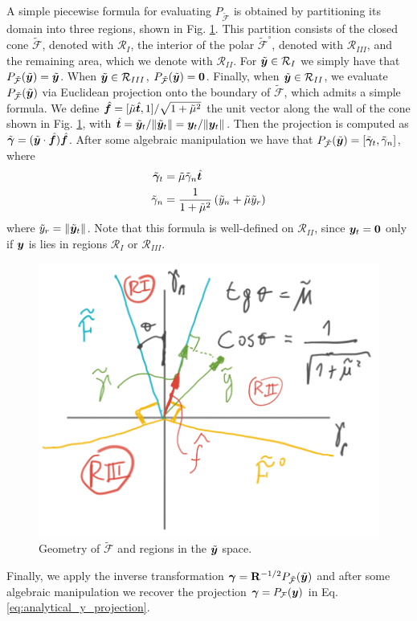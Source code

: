 A simple piecewise formula for evaluating $P_{\tilde{\mathcal{F}}}$ is obtained
by partitioning its domain  into three regions, shown in Fig. \ref{fig:cone_regions}. This partition consists of the
closed cone $\tilde{\mathcal{F}}$, denoted with $\mathcal{R}_I$, the interior of the
polar $\tilde{\mathcal{F}}^\circ$, denoted with $\mathcal{R}_{III}$, and the
remaining area, which we denote with $\mathcal{R}_{II}$. For $\tilde{{\bm{y}}}\in\mathcal{R}_I$ we simply have
that $P_{\tilde{\mathcal{F}}}(\tilde{{\bm{y}}}) = \tilde{{\bm{y}}}$. When $\tilde{{\bm{y}}}\in\mathcal{R}_{III}$,
$P_{\tilde{\mathcal{F}}}(\tilde{{\bm{y}}}) = {\bm{0}}$. Finally, when $\tilde{{\bm{y}}}\in\mathcal{R}_{II}$, we
evaluate $P_{\tilde{\mathcal{F}}}(\tilde{{\bm{y}}})$ via Euclidean projection onto
the boundary of $\tilde{\mathcal{F}}$, which admits a simple formula. We define
$\hat{{\bm{f}}}=[\tilde{\mu}\hat{{\bm{t}}}, 1]/\sqrt{1+\tilde{\mu}^2}$ the unit
vector along the wall of the cone shown in Fig. \ref{fig:cone_regions}, with
$\hat{{\bm{t}}}=\tilde{{\bm{y}}}_t/\Vert\tilde{{\bm{y}}}_t\Vert={\bm{y}}_t/\Vert{\bm{y}}_t\Vert$. Then the projection is computed as
$\tilde{{\bm\gamma}}=(\tilde{{\bm{y}}}\cdot\hat{{\bm{f}}})\hat{{\bm{f}}}$. After some algebraic manipulation we have that 
$P_{\tilde{\mathcal{F}}}(\tilde{{\bm{y}}}) = [\tilde{{\bm\gamma}}_t, \tilde{\gamma}_n]$,
where
\begin{align}\label{eq:ProjectionFormula}
\begin{aligned}
  \tilde{\bgamma}_t       &= \tilde{\mu}\tilde{\gamma}_n\hat{\vf{t}}\\
        \tilde{\gamma}_n  &= \frac{1}{1+\tilde{\mu}^2}\left(\tilde{y}_n +
	\tilde{\mu}\tilde{y}_r\right)
\end{aligned}
\end{align}
where $\tilde{y}_r=\Vert\tilde{{\bm{y}}}_t\Vert$. Note that this formula is
well-defined on $\mathcal{R}_{II}$, since ${\bm{y}}_t = {\bm{0}}$ only if ${\bm{y}}$ is lies in regions $\mathcal{R}_{I}$ or $\mathcal{R}_{III}$.
\begin{figure}[!h]
    \centering
    \includegraphics[width=0.45\columnwidth]{figures/cone_regions.png}
    \caption{Geometry of $\tilde{\mathcal{F}}$ and regions in the
    $\tilde{{\bm{y}}}$ space.}
    \label{fig:cone_regions}
\end{figure}

Finally, we apply the inverse transformation
${\bm\gamma}={\mathbf{R}}^{-1/2}P_{\tilde{\mathcal{F}}}(\tilde{{\bm{y}}})$ and after some
algebraic manipulation we recover the projection ${\bm\gamma} =
P_\mathcal{F}({\bm{y}})$ in Eq. \eqref{eq:analytical_y_projection}.


